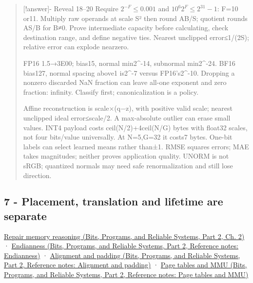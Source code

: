 \begin{quote}
{[}!answer{]}- Reveal 18--20 Require \(2^{-F}\le0.001\) and \(10^6 2^F\le2^{31}-1\): F=10 or11. Multiply raw operands at scale S² then round AB/S; quotient rounds AS/B for B≠0. Prove intermediate capacity before calculating, check destination range, and define negative ties. Nearest unclipped error≤1/(2S); relative error can explode nearzero.

FP16 1.5→3E00; bias15, normal min2\^{}-14, subnormal min2\^{}-24. BF16 bias127, normal spacing above1 is2\^{}-7 versus FP16's2\^{}-10. Dropping a nonzero discarded NaN fraction can leave all-one exponent and zero fraction: infinity. Classify first; canonicalization is a policy.

Affine reconstruction is scale×(q−z), with positive valid scale; nearest unclipped ideal error≤scale/2. A max-absolute outlier can erase small values. INT4 payload costs ceil(N/2)+4ceil(N/G) bytes with float32 scales, not four bits/value universally. At N=5,G=32 it costs7 bytes. One-bit labels can select learned means rather than±1. RMSE squares errors; MAE takes magnitudes; neither proves application quality. UNORM is not sRGB; quantized normals may need safe renormalization and still lose direction.
\end{quote}

\subsection{7 - Placement, translation and lifetime are separate}\label{appendix-ef4d27797a92-placement-translation-and-lifetime-are-separate}

\hypertarget{appendix-ef4d27797a92-placement-translation-and-lifetime-are-separate}{}

\href{../01-Bits-Programs-and-Reliable-Systems-P02/main.pdf\#nameddest=01-foundations-i-ch002-where-the-bytes-live}{Repair memory reasoning (Bits, Programs, and Reliable Systems, Part 2, Ch. 2)} · \href{../01-Bits-Programs-and-Reliable-Systems-P02/main.pdf\#nameddest=appendix-bc07c3d25b18}{Endianness (Bits, Programs, and Reliable Systems, Part 2, Reference notes: Endianness)} · \href{../01-Bits-Programs-and-Reliable-Systems-P02/main.pdf\#nameddest=appendix-a1f7c53b4742}{Alignment and padding (Bits, Programs, and Reliable Systems, Part 2, Reference notes: Alignment and padding)} · \href{../01-Bits-Programs-and-Reliable-Systems-P02/main.pdf\#nameddest=appendix-01e5905165c4}{Page tables and MMU (Bits, Programs, and Reliable Systems, Part 2, Reference notes: Page tables and MMU)}

